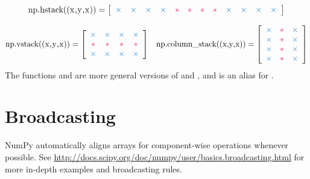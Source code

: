 \begin{align*}
\text{\li{np.hstack((x,y,x))}} =
\left[\begin{array}{cccccccccccc}
\textcolor{blue}{\times}&\textcolor{blue}{\times}&\textcolor{blue}{\times}&\textcolor{blue}{\times}&
\textcolor{red}{*}&\textcolor{red}{*}&\textcolor{red}{*}&\textcolor{red}{*}&
\textcolor{blue}{\times}&\textcolor{blue}{\times}&\textcolor{blue}{\times}&\textcolor{blue}{\times}
\end{array}\right]
\end{align*}

\begin{align*}
\text{\li{np.vstack((x,y,x))}} =
\left[\begin{array}{cccc}
\textcolor{blue}{\times}&\textcolor{blue}{\times}&\textcolor{blue}{\times}&\textcolor{blue}{\times}\\
\textcolor{red}{*}&\textcolor{red}{*}&\textcolor{red}{*}&\textcolor{red}{*}\\
\textcolor{blue}{\times}&\textcolor{blue}{\times}&\textcolor{blue}{\times}&\textcolor{blue}{\times}
\end{array}\right]
&&
\text{\li{np.column_stack((x,y,x))}} =
\left[\begin{array}{ccc}
\textcolor{blue}{\times}&\textcolor{red}{*}&\textcolor{blue}{\times}\\
\textcolor{blue}{\times}&\textcolor{red}{*}&\textcolor{blue}{\times}\\
\textcolor{blue}{\times}&\textcolor{red}{*}&\textcolor{blue}{\times}\\
\textcolor{blue}{\times}&\textcolor{red}{*}&\textcolor{blue}{\times}
\end{array}\right]
\end{align*}
The functions  and  are more general versions of  and , and  is an alias for .

\section*{Broadcasting} %

NumPy automatically aligns arrays for component-wise operations whenever possible.
See \url{http://docs.scipy.org/doc/numpy/user/basics.broadcasting.html} for more in-depth examples and broadcasting rules.

